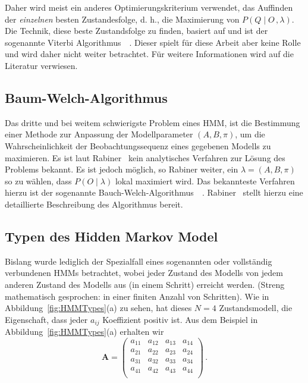\newline
Daher wird meist ein anderes Optimierungskriterium verwendet, das Auffinden der \textit{einzelnen} besten Zustandesfolge, d. h., die Maximierung von $P (Q \mid O \, , \lambda)$. Die Technik, diese beste Zustandsfolge zu finden, basiert auf  und ist der sogenannte Viterbi Algorithmus~\cite{bib:viterbi}~\cite{bib:forney}.
\newline
Dieser spielt f\"ur diese Arbeit aber keine Rolle und wird daher nicht weiter betrachtet. F\"ur weitere Informationen wird auf die Literatur verwiesen.

\subsection{Baum-Welch-Algorithmus}
Das dritte und bei weitem schwierigste Problem eines \gls{HMM}, ist die Bestimmung einer Methode zur Anpassung der Modellparameter $(A, B, \pi)$, um die Wahrscheinlichkeit der Beobachtungssequenz eines gegebenen Modells zu maximieren.
\newline
Es ist laut Rabiner~\cite[S.~264]{bib:hmmrabiner} kein analytisches Verfahren zur L\"osung des Problems bekannt. Es ist jedoch m\"oglich, so Rabiner weiter, ein $\lambda = (A, B, \pi)$ so zu w\"ahlen, dass $P (O \mid \lambda)$ lokal maximiert wird. Das bekannteste Verfahren hierzu ist der sogenannte Bauch-Welch-Algorithmus~\cite{bib:baumFellow}~\cite{bib:baumWelch}.
\newline
Rabiner~\cite[S.~264ff]{bib:hmmrabiner} stellt hierzu eine detaillierte Beschreibung des Algorithmus bereit.

\subsection{Typen des Hidden Markov Model}
Bislang wurde lediglich der Spezialfall eines sogenannten  oder vollst\"andig verbundenen \acrshort{HMM}s betrachtet, wobei jeder Zustand des Modells von jedem anderen Zustand des Modells aus (in einem Schritt) erreicht werden. (Streng mathematisch gesprochen: in einer finiten Anzahl von Schritten). Wie in Abbildung~\ref{fig:HMMTypes}(a) zu sehen, hat dieses $N = 4$ Zustandsmodell, die Eigenschaft, dass jeder $a_{ij}$ Koeffizient positiv ist. Aus dem Beispiel in Abbildung~\ref{fig:HMMTypes}(a) erhalten wir
\begin{equation}
\mathbf{A} = 
\begin{pmatrix}
a_{11} & a_{12} & a_{13} & a_{14} \\
a_{21} & a_{22} & a_{23} & a_{24} \\
a_{31} & a_{32} & a_{33} & a_{34} \\
a_{41} & a_{42} & a_{43} & a_{44} \\
\end{pmatrix} \, .
\end{equation}


